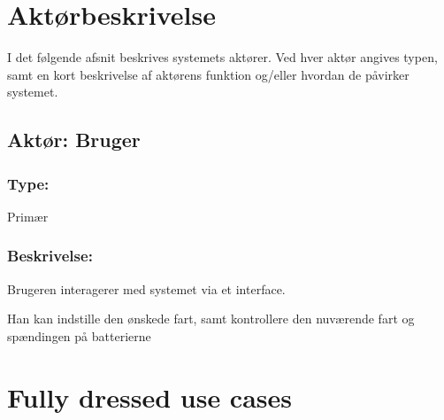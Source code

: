 

\section{Aktørbeskrivelse}
I det følgende afsnit beskrives systemets aktører. Ved hver aktør angives typen, samt en kort beskrivelse af aktørens funktion og/eller hvordan de påvirker systemet.

\begin{framed}
	\subsection{Aktør: Bruger}
	\subsubsection*{Type:}
		Primær
	
	\subsubsection*{Beskrivelse:}
		Brugeren interagerer med systemet via et interface.
		
		Han kan indstille den ønskede fart, samt kontrollere den nuværende fart og \indent spændingen på batterierne
\end{framed}

\clearpage


\section{Fully dressed use cases}

